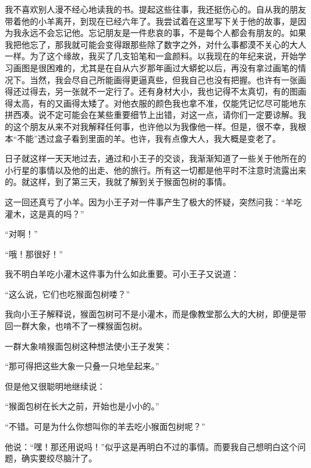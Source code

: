 我不喜欢别人漫不经心地读我的书。提起这些往事，我还挺伤心的。自从我的朋友带着他的小羊离开，到现在已经六年了。我尝试着在这里写下关于他的故事，是因为我永远不会忘记他。忘记朋友是一件悲哀的事，不是每个人都会有朋友的。如果我把他忘了，那我就可能会变得跟那些除了数字之外，对什么事都漠不关心的大人一样。为了这个缘故，我买了几支铅笔和一盒颜料。以我现在的年纪来说，开始学习画图是很困难的，尤其是在自从六岁那年画过大蟒蛇以后，再没有拿过画笔的情况下。当然，我会尽自己所能画得更逼真些，但我自己也没有把握。也许有一张画得还过得去，另一张就不一定行了。还有身材大小，我也记得不太真切，有的图画得太高，有的又画得太矮了。对他衣服的颜色我也拿不准，仅能凭记忆尽可能地东拼西凑。说不定可能会在某些重要细节上出错，对这一点，请你们一定要谅解。我的这个朋友从来不对我解释任何事，也许他以为我像他一样。但是，很不幸，我根本“不能”透过盒子看到里面的羊。也许，我有点像大人，我大概是变老了。


\stoptitle

\starttitle[title={5}]

日子就这样一天天地过去，通过和小王子的交谈，我渐渐知道了一些关于他所在的小行星的事情以及他的出走、他的旅行。所有这一切都是他平时不注意时流露出来的。就这样，到了第三天，我就了解到关于猴面包树的事情。

这一回还真亏了小羊。因为小王子对一件事产生了极大的怀疑，突然问我：“羊吃灌木，这是真的吗？”

“对啊！”

“哦！那很好！”

我不明白羊吃小灌木这件事为什么如此重要。可小王子又说道：

{\startalignment[center]
 \stopalignment}

“这么说，它们也吃猴面包树喽？”

我向小王子解释说，猴面包树可不是小灌木，而是像教堂那么大的大树，即便是带回一群大象，也啃不了一棵猴面包树。

一群大象啃猴面包树这种想法使小王子发笑：

“那可得把这些大象一只叠一只地垒起来。”

但是他又很聪明地继续说：

“猴面包树在长大之前，开始也是小小的。”

“不错。可是为什么你想叫你的羊去吃小猴面包树呢？”

他说：“嘿！那还用说吗！”似乎这是再明白不过的事情。而要我自己想明白这个问题，确实要绞尽脑汁了。

